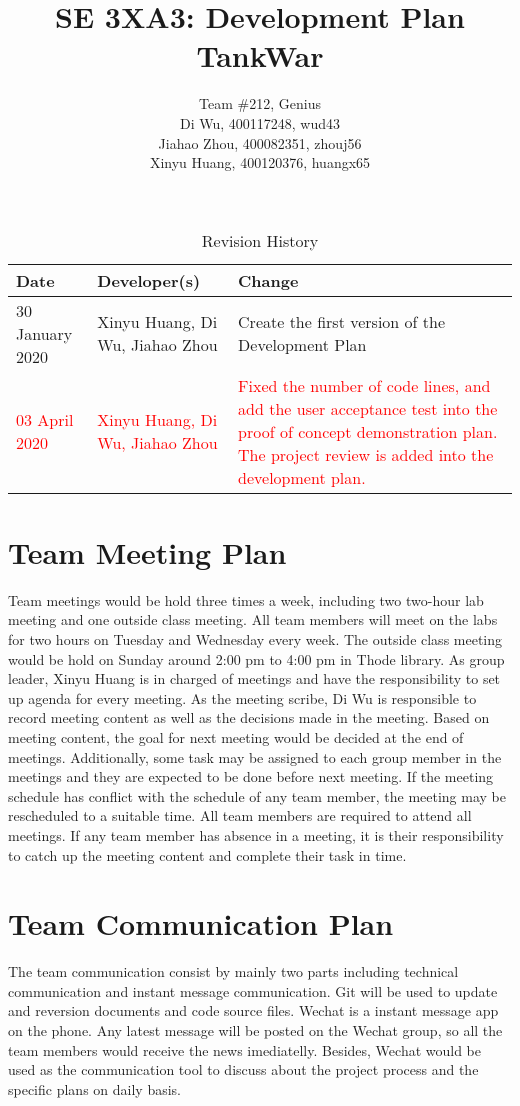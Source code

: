 \documentclass{article}
\title{SE 3XA3: Development Plan\\TankWar}
\author{Team \#212, Genius
		\\Di Wu, 400117248, wud43 
		\\Jiahao Zhou, 400082351, zhouj56 
		\\Xinyu Huang, 400120376, huangx65
}
\date{}
\begin{document}
\begin{table}[hp]
\caption{Revision History} \label{TblRevisionHistory}
\begin{tabularx}{\textwidth}{llX}
\toprule
\textbf{Date} & \textbf{Developer(s)} & \textbf{Change}\\
\midrule
30 January 2020 & Xinyu Huang, Di Wu, Jiahao Zhou & Create the first version of the Development Plan\\
\textcolor{red}{03 April 2020} & \textcolor{red}{Xinyu Huang, Di Wu, Jiahao Zhou} & \textcolor{red}{Fixed the number of code lines, and add the user acceptance test into the proof of concept demonstration plan. The project review is added into the development plan.}\\
\bottomrule
\end{tabularx}
\end{table}

\newpage

\maketitle

\section{Team Meeting Plan}
Team meetings would be hold three times a week, including two two-hour lab meeting and one outside class meeting. All team members will meet on the labs for two hours on Tuesday and Wednesday every week. The outside class meeting would be hold on Sunday around 2:00 pm to 4:00 pm in Thode library. As group leader, Xinyu Huang is in charged of meetings and have the responsibility to set up agenda for every meeting. As the meeting scribe, Di Wu is responsible to record meeting content as well as the decisions made in the meeting. Based on meeting content, the goal for next meeting would be decided at the end of meetings. Additionally, some task may be assigned to each group member in the meetings and they are expected to be done before next meeting. If the meeting schedule has conflict with the schedule of any team member, the meeting may be rescheduled to a suitable time. All team members are required to attend all meetings. If any team member has absence in a meeting, it is their responsibility to catch up the meeting content and complete their task in time.

\section{Team Communication Plan}
The team communication consist by mainly two parts including technical communication and instant message communication. Git will be used to update and reversion documents and code source files. Wechat is a instant message app on the phone. Any latest message will be posted on the Wechat group, so all the team members would receive the news imediatelly. Besides, Wechat would be used as the communication tool to discuss about the project process and the specific plans on daily basis.
\end{document}
